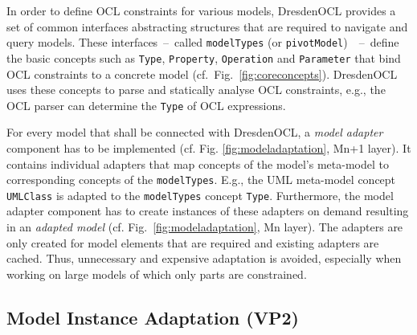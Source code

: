 	In order to define OCL constraints for various models,
	DresdenOCL provides a set of common interfaces abstracting structures
	that are required to navigate and query models.
	These interfaces~--~called \texttt{modelTypes} (or \texttt{pivotModel})~\cite{braeuerOCL07}~--~define
	the basic	concepts such as \texttt{Type}, \texttt{Property}, \texttt{Operation} and \texttt{Parameter}
	that bind OCL constraints to a concrete model (cf.~Fig.~\ref{fig:coreconcepts}).
	DresdenOCL uses these concepts to parse and statically analyse OCL constraints, 
	e.g., the OCL parser can determine the \texttt{Type} of OCL expressions.
	
	For every model that shall be connected with DresdenOCL, 
	a \emph{model adapter} component has to be implemented (cf. Fig. \ref{fig:modeladaptation}, Mn+1 layer). 
	It contains individual adapters that map concepts of the model's meta-model to corresponding concepts of the \texttt{modelTypes}. E.g., the UML
	meta-model concept \texttt{UMLClass} is adapted to the \texttt{modelTypes} concept
	\texttt{Type}. Furthermore, the model adapter component has to create 
	instances of these adapters on demand resulting in an \textit{adapted model} (cf. Fig.~\ref{fig:modeladaptation}, Mn layer).
	The adapters are only created for model elements that are required and
	existing adapters are cached. Thus, unnecessary and expensive adaptation is avoided, 
	especially when working on large models of which only parts are constrained.


\subsection{Model Instance Adaptation (VP2)}
	
